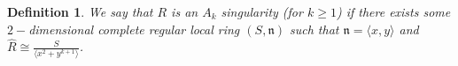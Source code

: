 \documentclass{article}
\newtheorem{definition}[theorem]{Definition}
\newtheorem{remark}[theorem]{Remark}
\DeclareMathOperator{\chara}{char}
\DeclareMathOperator{\edim}{edim}
\DeclareMathOperator{\mult}{mult}
\numberwithin{theorem}{section}
\begin{document}






\begin{definition}\label{def:A_k}
    We say that $R$ is an $A_{k}$ singularity (for $k \geq 1$) if there exists some $2-$dimensional complete regular local ring $(S, \mathfrak{n})$ such that $\mathfrak{n} = \langle x,y \rangle$ and $\hat{R} \cong \frac{S}{\langle x^2 +y^{k+1} \rangle}$. 
\end{definition}
\end{document}
